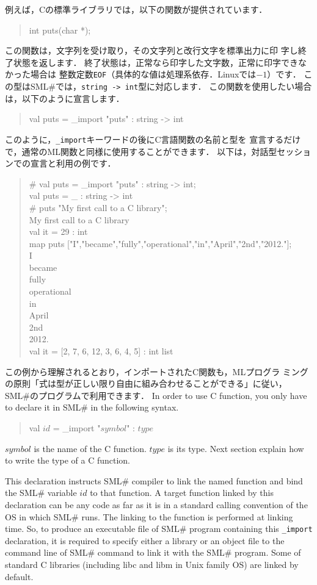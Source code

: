 \documentclass{jbook}
\newcommand{\smlsharp}{SML\#}
\newenvironment{program}{\begin{quote}\begin{tt}}%
                        {\end{tt}\end{quote}}
\begin{document}
	例えば，Cの標準ライブラリでは，以下の関数が提供されています．
\begin{program}
int puts(char *);
\end{program}
	この関数は，文字列を受け取り，その文字列と改行文字を標準出力に印
字し終了状態を返します．
	終了状態は，正常なら印字した文字数，正常に印字できなかった場合は
整数定数{\tt EOF}（具体的な値は処理系依存．Linuxでは$-1$）です．
	この型は\smlsharp{}では，{\tt string -> int}型に対応します．
	この関数を使用したい場合は，以下のように宣言します．
\begin{program}
val puts = \_import "puts" : string -> int
\end{program}
	このように，{\tt \_import}キーワードの後にC言語関数の名前と型を
宣言するだけで，通常のML関数と同様に使用することができます．
	以下は，対話型セッションでの宣言と利用の例です．
\begin{program}
\# val puts = \_import "puts" : string -> int;\\
val puts = \_ : string -> int\\
\# puts "My first call to a C library";\\
My first call to a C library\\
val it = 29 : int\\
map puts  ["I","became","fully","operational","in","April","2nd","2012."];\\
I\\
became\\
fully\\
operational\\
in\\
April\\
2nd\\
2012.\\
val it = [2, 7, 6, 12, 3, 6, 4, 5] : int list
\end{program}
	この例から理解されるとおり，インポートされたC関数も，MLプログラ
ミングの原則「式は型が正しい限り自由に組み合わせることができる」に従い，
\smlsharp{}のプログラムで利用できます．
\else%
	In order to use C function, you only have to declare it in
\smlsharp{} in the following syntax.
\begin{program}
val $\mathit{id}$ = \_import "$\mathit{symbol}$" : $\mathit{type}$
\end{program}
	$\mathit{symbol}$ is the name of the C function.
	$\mathit{type}$ is its type.
	Next section explain how to write the type of a C function.

	This declaration instructs \smlsharp{} compiler to link the
named function and bind the \smlsharp{} variable $\mathit{id}$ to
that function.
	A target function linked by this declaration can be any code
as far as it is in a standard calling convention of the OS in which
\smlsharp{} runs.
	The linking to the function is performed at linking time.
	So, to produce an executable file of \smlsharp{} program containing
this {\tt \_import} declaration, it is required to specify either
a library or an object file to the command line of \smlsharp{} command to
link it with the \smlsharp{} program.
	Some of standard C libraries (including libc and libm in Unix
family OS) are linked by default.
\end{document}

